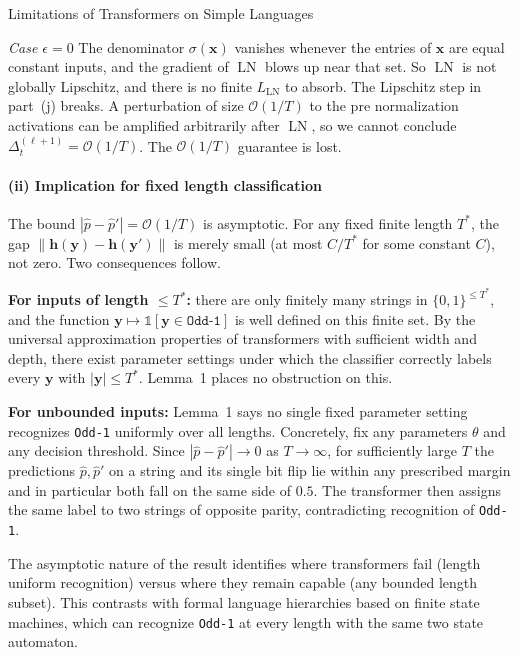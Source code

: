 \begin{question}{Limitations of Transformers on Simple Languages}
\begin{subquestion}
    \emph{Case $\epsilon = 0$} 
    The denominator $\sigma(\mathbf{x})$ vanishes whenever the entries of $\mathbf{x}$ are equal constant inputs, and the gradient of $\operatorname{LN}$ blows up near that set. 
    So $\operatorname{LN}$ is not globally Lipschitz, and there is no finite $L_{\operatorname{LN}}$ to absorb. 
    The Lipschitz step in part~(j) breaks. 
    A perturbation of size $\mathcal{O}(1/T)$ to the pre normalization activations can be amplified arbitrarily after $\operatorname{LN}$, so we cannot conclude $\Delta_t^{(\ell+1)} = \mathcal{O}(1/T)$. 
    The $\mathcal{O}(1/T)$ guarantee is lost.

    \paragraph{(ii) Implication for fixed length classification}
    The bound $|\hat{p} - \hat{p}'| = \mathcal{O}(1/T)$ is asymptotic. 
    For any fixed finite length $T^{*}$, the gap $\|\mathbf{h}(\mathbf{y}) - \mathbf{h}(\mathbf{y}')\|$ is merely small (at most $C/T^{*}$ for some constant $C$), not zero. 
    Two consequences follow.

    \textbf{For inputs of length $\le T^{*}$:} there are only finitely many strings in $\{0, 1\}^{\le T^{*}}$, and the function $\mathbf{y} \mapsto \mathbb{1}[\mathbf{y} \in \texttt{Odd-1}]$ is well defined on this finite set. 
    By the universal approximation properties of transformers with sufficient width and depth, there exist parameter settings under which the classifier correctly labels every $\mathbf{y}$ with $|\mathbf{y}| \le T^{*}$. 
    Lemma~1 places no obstruction on this.

    \textbf{For unbounded inputs:} Lemma~1 says no single fixed parameter setting recognizes \texttt{Odd-1} uniformly over all lengths. 
    Concretely, fix any parameters $\theta$ and any decision threshold. 
    Since $|\hat{p} - \hat{p}'| \to 0$ as $T \to \infty$, for sufficiently large $T$ the predictions $\hat{p}, \hat{p}'$ on a string and its single bit flip lie within any prescribed margin and in particular both fall on the same side of $0.5$. 
    The transformer then assigns the same label to two strings of opposite parity, contradicting recognition of \texttt{Odd-1}.

    The asymptotic nature of the result identifies where transformers fail (length uniform recognition) versus where they remain capable (any bounded length subset). 
    This contrasts with formal language hierarchies based on finite state machines, which can recognize \texttt{Odd-1} at every length with the same two state automaton.
\end{subquestion}

\end{question}
